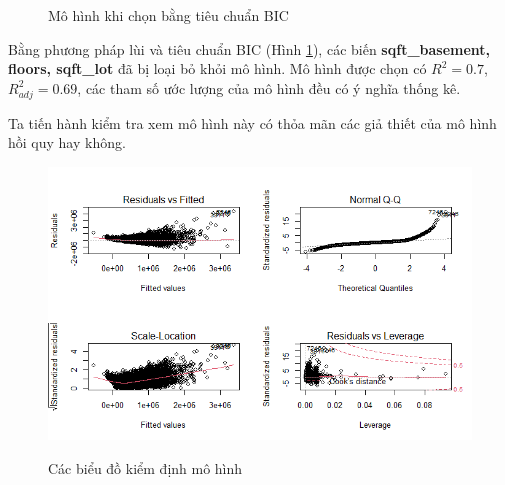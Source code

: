 \begin{figure}[h!]
	\centering
	\hfill
	\caption{Mô hình khi chọn bằng tiêu chuẩn BIC}
	\label{B2_BIC}
\end{figure}
 Bằng phương pháp lùi và tiêu chuẩn BIC (Hình \ref{B2_BIC}), các biến \textbf{sqft\_basement, floors, sqft\_lot} đã bị loại bỏ khỏi mô hình. Mô hình được chọn có $R^2=0.7$, $R^2_{adj}=0.69$, các tham số ước lượng của mô hình đều có ý nghĩa thống kê.
 
 Ta tiến hành kiểm tra xem mô hình này có thỏa mãn các giả thiết của mô hình hồi quy hay không.
 
 \begin{figure}[h!]
 	\centering
 	{\includegraphics[width=.85\linewidth]{../Photo Of Result/B2_originalmodel}}
 	\caption{Các biểu đồ kiểm định mô hình}
 	\label{B2_check}
 \end{figure}
 
